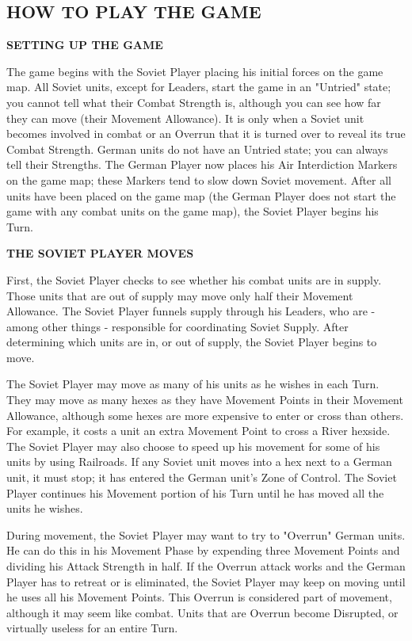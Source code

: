\begin{flushleft}
  \section{HOW TO PLAY THE GAME}
\end{flushleft}

\textbf{SETTING UP THE GAME}

The game begins with the Soviet Player placing his initial forces on the game map. All Soviet units, except for Leaders, start the game in an "Untried" state; you cannot tell what their Combat Strength is, although you can see how far they can move (their Movement Allowance). It is only when a Soviet unit becomes involved in combat or an Overrun that it is turned over to reveal its true Combat Strength. German units do not have an Untried state; you can always tell their Strengths. The German Player now places his Air Interdiction Markers on the game map; these Markers tend to slow down Soviet movement. After all units have been placed on the game map (the German Player does not start the game with any combat units on the game map), the Soviet Player begins his Turn.

\textbf{THE SOVIET PLAYER MOVES}

First, the Soviet Player checks to see whether his combat units are in supply. Those units that are out of supply may move only half their Movement Allowance. The Soviet Player funnels supply through his Leaders, who are - among other things - responsible for coordinating Soviet Supply. After determining which units are in, or out of supply, the Soviet Player begins to move.

The Soviet Player may move as many of his units as he wishes in each Turn. They may move as many hexes as they have Movement Points in their Movement Allowance, although some hexes are more expensive to enter or cross than others. For example, it costs a unit an extra Movement Point to cross a River hexside. The Soviet Player may also choose to speed up his movement for some of his units by using Railroads. If any Soviet unit moves into a hex next to a German unit, it must stop; it has entered the German unit's Zone of Control. The Soviet Player continues his Movement portion of his Turn until he has moved all the units he wishes.

During movement, the Soviet Player may want to try to "Overrun" German units. He can do this in his Movement Phase by expending three Movement Points and dividing his Attack Strength in half. If the Overrun attack works and the German Player has to retreat or is eliminated, the Soviet Player may keep on moving until he uses all his Movement Points. This Overrun is considered part of movement, although it may seem like combat. Units that are Overrun become Disrupted, or virtually useless for an entire Turn.

